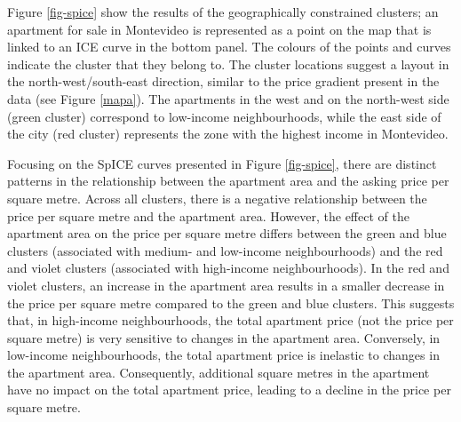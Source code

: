 \documentclass[smallextended,natbib]{svjour3}\usepackage[]{graphicx}\usepackage[]{xcolor}
\begin{document}
Figure \ref{fig-spice} show the results of the geographically constrained clusters; an apartment for sale in Montevideo is represented as a point on the map that is linked to an ICE curve in the bottom panel. The colours of the points and curves indicate the cluster that they belong to. The cluster locations suggest a layout in the north-west/south-east direction, similar to the price gradient present in the data (see Figure \ref{mapa}). The apartments in the west and on the north-west side (green cluster) correspond to low-income neighbourhoods, while the east side of the city (red cluster) represents the zone with the highest income in Montevideo. 

Focusing on the SpICE curves presented in Figure \ref{fig-spice}, there are distinct patterns in the relationship between the apartment area and the asking price per square metre. Across all clusters, there is a negative relationship between the price per square metre and the apartment area. However, the effect of the apartment area on the price per square metre differs between the green and blue clusters (associated with medium- and low-income neighbourhoods) and the red and violet clusters (associated with high-income neighbourhoods). In the red and violet clusters, an increase in the apartment area results in a smaller decrease in the price per square metre compared to the green and blue clusters. This suggests that, in high-income neighbourhoods, the total apartment price (not the price per square metre) is very sensitive to changes in the apartment area. Conversely, in low-income neighbourhoods, the total apartment price is inelastic to changes in the apartment area. Consequently, additional square metres in the apartment have no impact on the total apartment price, leading to a decline in the price per square metre. %
\end{document}
